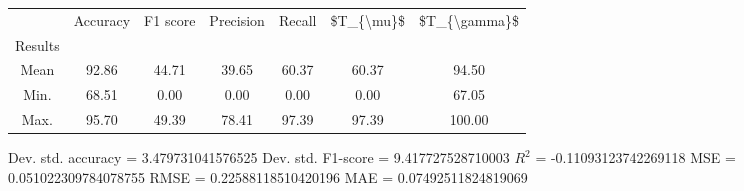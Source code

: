 \begin{tabular}{|c|c|c|c|c|c|c|}
\toprule
{} &  Accuracy &  F1 score &  Precision &  Recall &  \$T\_\{\textbackslash mu\}\$ &  \$T\_\{\textbackslash gamma\}\$ \\
Results &           &           &            &         &            &               \\
\hline
Mean    &     92.86 &     44.71 &      39.65 &   60.37 &      60.37 &         94.50 \\
Min.    &     68.51 &      0.00 &       0.00 &    0.00 &       0.00 &         67.05 \\
Max.    &     95.70 &     49.39 &      78.41 &   97.39 &      97.39 &        100.00 \\
\bottomrule
\end{tabular}

 Dev. std. accuracy = 3.479731041576525
 Dev. std. F1-score = 9.417727528710003
 $R^2$ = -0.11093123742269118
 MSE = 0.051022309784078755
 RMSE = 0.22588118510420196
 MAE = 0.07492511824819069